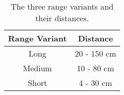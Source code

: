 \begin{table}[H]
\centering
\setlength\extrarowheight{3pt}
\begin{tabulary}{\textwidth}{|C|C|}
\hline
\textbf{Range Variant} & \textbf{Distance} \\
\hline
Long & 20 - 150 cm \\
\hline
Medium & 10 - 80 cm \\
\hline
Short & 4 - 30 cm \\
\hline
\end{tabulary}
\caption{The three range variants and their distances.}
\label{mindsensorranges}
\end{table}
\FloatBarrier
